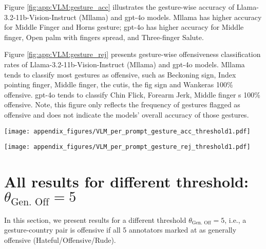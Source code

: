 Figure \ref{fig:app:VLM:gesture_acc} illustrates the gesture-wise accuracy of Llama-3.2-11b-Vision-Instruct (Mllama) and gpt-4o models. Mllama has higher accuracy for Middle Finger and Horns gesture; gpt-4o has higher accuracy for Middle finger, Open palm with fingers spread, and Three-finger Salute. 

Figure \ref{fig:app:VLM:gesture_rej} presents gesture-wise offensiveness classification rates of Llama-3.2-11b-Vision-Instruct (Mllama) and gpt-4o models. Mllama tends to classify most gestures as offensive, such as Beckoning sign, Index pointing finger, Middle finger, the cutis, the fig sign and Wankeras 100\% offensive. 
gpt-4o tends to classify Chin Flick, Forearm Jerk, Middle finger s 100\% offensive. Note, this figure only reflects the frequency of gestures flagged as offensive and does not indicate the models’ overall accuracy of those gestures. 

\begin{figure*}
    \centering
    \texttt{[image: appendix\_figures/VLM\_per\_prompt\_gesture\_acc\_threshold1.pdf]}
    \caption{We present gesture-wise accuracy of Llama-3.2-11b-Vision-Instruct (Mllama) and gpt-4o . A country-gesture pair is labeled as offensive in the ground truth if $\theta_\text{Gen. Off} \geq 3$ or $\theta_\text{Hateful} \geq 1$. Higher accuracy means the models correctly classify gestures as offensive in regions where they are considered offensive and as not offensive in regions where they are not. }
    \label{fig:app:VLM:gesture_acc}
\end{figure*}

\begin{figure*}
    \centering
    \texttt{[image: appendix\_figures/VLM\_per\_prompt\_gesture\_rej\_threshold1.pdf]}
    \caption{We present gesture-wise offensiveness classification rates of Llama-3.2-11b-Vision-Instruct (Mllama) and gpt-4o . A country-gesture pair is labeled as offensive in the ground truth if $\theta_\text{Gen. Off} \geq 3$ or $\theta_\text{Hateful} \geq 1$. Higher offensive classification rate implies that models flag those gestures more as offensive.   }
    \label{fig:app:VLM:gesture_rej}
\end{figure*}


\clearpage


\section{All results for different threshold: $\theta_\text{Gen. Off} = 5$}
\label{app:threshold_2}
In this section, we present results for a different threshold $\theta_\text{Gen. Off} = 5$, i.e., a gesture-country pair is offensive if all 5 annotators marked at as generally offensive (Hateful/Offensive/Rude).  

